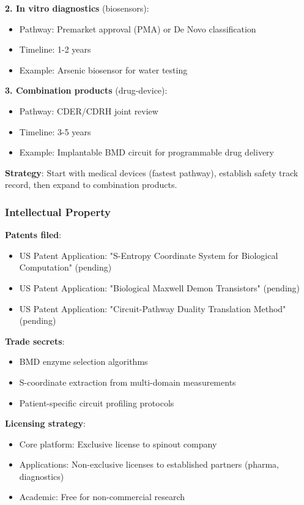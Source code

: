 \documentclass[11pt,a4paper]{article}
\begin{document}
\textbf{2. In vitro diagnostics} (biosensors):
\begin{itemize}
\item Pathway: Premarket approval (PMA) or De Novo classification
\item Timeline: 1-2 years
\item Example: Arsenic biosensor for water testing
\end{itemize}

\textbf{3. Combination products} (drug-device):
\begin{itemize}
\item Pathway: CDER/CDRH joint review
\item Timeline: 3-5 years
\item Example: Implantable BMD circuit for programmable drug delivery
\end{itemize}

\textbf{Strategy}: Start with medical devices (fastest pathway), establish safety track record, then expand to combination products.

\subsubsection{Intellectual Property}

\textbf{Patents filed}:
\begin{itemize}
\item US Patent Application: "S-Entropy Coordinate System for Biological Computation" (pending)
\item US Patent Application: "Biological Maxwell Demon Transistors" (pending)
\item US Patent Application: "Circuit-Pathway Duality Translation Method" (pending)
\end{itemize}

\textbf{Trade secrets}:
\begin{itemize}
\item BMD enzyme selection algorithms
\item S-coordinate extraction from multi-domain measurements
\item Patient-specific circuit profiling protocols
\end{itemize}

\textbf{Licensing strategy}:
\begin{itemize}
\item Core platform: Exclusive license to spinout company
\item Applications: Non-exclusive licenses to established partners (pharma, diagnostics)
\item Academic: Free for non-commercial research
\end{itemize}
\end{document}

